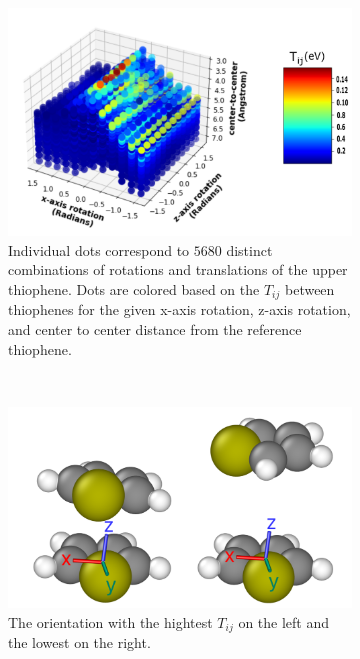 \begin{figure}
\centering
\begin{subfigure}{.9\textwidth}
    \centering
    \includegraphics[width=\textwidth]{figures/transfer_integral_plot.png}
    \caption{Individual dots correspond to $5680$ 
    distinct combinations of rotations and translations of the upper
    thiophene.
    Dots are colored based on the $T_{ij}$ between thiophenes for the given x-axis rotation,
    z-axis rotation, and center to
    center distance from the reference thiophene.}
\end{subfigure}
\\
\begin{subfigure}{.5\textwidth}
    \centering
    \includegraphics[width=\textwidth]{figures/thiophene-oreintations.png}
    \caption{The orientation with the hightest $T_{ij}$ on the left and
    the lowest on the right.}
\end{subfigure}%
\caption{ }
\label{TIplots}
\end{figure}

